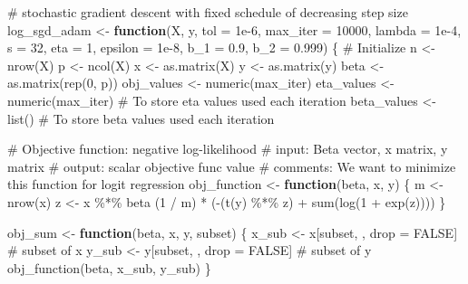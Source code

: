 \documentclass[
  letterpaper,
  DIV=11,
  numbers=noendperiod]{scrartcl}
\newenvironment{Shaded}{\begin{snugshade}}{\end{snugshade}}
\newcommand{\AttributeTok}[1]{\textcolor[rgb]{0.40,0.45,0.13}{#1}}
\newcommand{\CommentTok}[1]{\textcolor[rgb]{0.37,0.37,0.37}{#1}}
\newcommand{\ConstantTok}[1]{\textcolor[rgb]{0.56,0.35,0.01}{#1}}
\newcommand{\ControlFlowTok}[1]{\textcolor[rgb]{0.00,0.23,0.31}{\textbf{#1}}}
\newcommand{\DecValTok}[1]{\textcolor[rgb]{0.68,0.00,0.00}{#1}}
\newcommand{\FloatTok}[1]{\textcolor[rgb]{0.68,0.00,0.00}{#1}}
\newcommand{\FunctionTok}[1]{\textcolor[rgb]{0.28,0.35,0.67}{#1}}
\newcommand{\NormalTok}[1]{\textcolor[rgb]{0.00,0.23,0.31}{#1}}
\newcommand{\OtherTok}[1]{\textcolor[rgb]{0.00,0.23,0.31}{#1}}
\newcommand{\SpecialCharTok}[1]{\textcolor[rgb]{0.37,0.37,0.37}{#1}}
\begin{document}
\begin{Shaded}
\begin{Highlighting}[]
\CommentTok{\# stochastic gradient descent with fixed schedule of decreasing step size}
\NormalTok{log\_sgd\_adam }\OtherTok{\textless{}{-}} \ControlFlowTok{function}\NormalTok{(X, y, }\AttributeTok{tol =} \FloatTok{1e{-}6}\NormalTok{, }\AttributeTok{max\_iter =} \DecValTok{10000}\NormalTok{, }\AttributeTok{lambda =} \FloatTok{1e{-}4}\NormalTok{, }\AttributeTok{s =} \DecValTok{32}\NormalTok{, }\AttributeTok{eta =} \DecValTok{1}\NormalTok{, }\AttributeTok{epsilon =} \FloatTok{1e{-}8}\NormalTok{, }\AttributeTok{b\_1 =} \FloatTok{0.9}\NormalTok{, }\AttributeTok{b\_2 =} \FloatTok{0.999}\NormalTok{) \{}
  \CommentTok{\# Initialize}
\NormalTok{  n }\OtherTok{\textless{}{-}} \FunctionTok{nrow}\NormalTok{(X)}
\NormalTok{  p }\OtherTok{\textless{}{-}} \FunctionTok{ncol}\NormalTok{(X)}
\NormalTok{  x }\OtherTok{\textless{}{-}} \FunctionTok{as.matrix}\NormalTok{(X)}
\NormalTok{  y }\OtherTok{\textless{}{-}} \FunctionTok{as.matrix}\NormalTok{(y)}
\NormalTok{  beta }\OtherTok{\textless{}{-}} \FunctionTok{as.matrix}\NormalTok{(}\FunctionTok{rep}\NormalTok{(}\DecValTok{0}\NormalTok{, p))}
\NormalTok{  obj\_values }\OtherTok{\textless{}{-}} \FunctionTok{numeric}\NormalTok{(max\_iter)}
\NormalTok{  eta\_values }\OtherTok{\textless{}{-}} \FunctionTok{numeric}\NormalTok{(max\_iter)  }\CommentTok{\# To store eta values used each iteration}
\NormalTok{  beta\_values }\OtherTok{\textless{}{-}} \FunctionTok{list}\NormalTok{() }\CommentTok{\# To store beta values used each iteration}
  
  \CommentTok{\# Objective function: negative log{-}likelihood}
  \CommentTok{\# input: Beta vector, x matrix, y matrix}
  \CommentTok{\# output: scalar objective func value}
  \CommentTok{\# comments: We want to minimize this function for logit regression}
\NormalTok{   obj\_function }\OtherTok{\textless{}{-}} \ControlFlowTok{function}\NormalTok{(beta, x, y) \{}
\NormalTok{    m }\OtherTok{\textless{}{-}} \FunctionTok{nrow}\NormalTok{(x)}
\NormalTok{    z }\OtherTok{\textless{}{-}}\NormalTok{ x }\SpecialCharTok{\%*\%}\NormalTok{ beta}
\NormalTok{    (}\DecValTok{1} \SpecialCharTok{/}\NormalTok{ m) }\SpecialCharTok{*}\NormalTok{ (}\SpecialCharTok{{-}}\NormalTok{(}\FunctionTok{t}\NormalTok{(y) }\SpecialCharTok{\%*\%}\NormalTok{ z) }\SpecialCharTok{+} \FunctionTok{sum}\NormalTok{(}\FunctionTok{log}\NormalTok{(}\DecValTok{1} \SpecialCharTok{+} \FunctionTok{exp}\NormalTok{(z))))}
\NormalTok{  \}}
  
\NormalTok{  obj\_sum }\OtherTok{\textless{}{-}} \ControlFlowTok{function}\NormalTok{(beta, x, y, subset) \{}
\NormalTok{    x\_sub }\OtherTok{\textless{}{-}}\NormalTok{ x[subset, , drop }\OtherTok{=} \ConstantTok{FALSE}\NormalTok{]   }\CommentTok{\# subset of x}
\NormalTok{    y\_sub }\OtherTok{\textless{}{-}}\NormalTok{ y[subset, , drop }\OtherTok{=} \ConstantTok{FALSE}\NormalTok{]   }\CommentTok{\# subset of y}
    \FunctionTok{obj\_function}\NormalTok{(beta, x\_sub, y\_sub)}
\NormalTok{  \}}
  

\end{Highlighting}
\end{Shaded}
\end{document}
